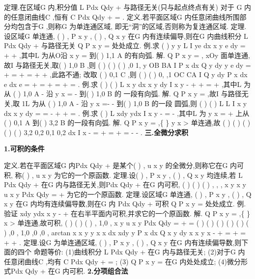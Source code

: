 \textcolor{lyred}{定理}.在区域G 内,积分值
L
Pdx
Qdy
+
\int 
与路径无关(只与起点终点有关) \Leftrightarrow 对于 
G 内的任意闭曲线C ,恒有
C
Pdx
Qdy
+
=
\int \nabla 
. 
\textcolor{lyred}{定义}.若平面区域G 内任意闭曲线所围部分均包含于G ,则称G 为\textcolor{lyred}{单连通区域},\textcolor{lyred}{ }
即无“洞”的区域,否则称为\textcolor{lyred}{复连通区域}. 
\textcolor{lyred}{定理}.设区域G 单连通,
(
)
,
P x y ,
(
)
,
Q x y 在G 内有连续偏导,则在G 内曲线积分 
L
Pdx
Qdy
+
\int 
与路径无关
Q
P
x
y
\partial 
\partial 
\Leftrightarrow 
=
\partial 
\partial 处处成立. 
\textcolor{lyred}{例}.求
(
)
y
y
L
I
ye dx
x
y
e dy
=
+
+
\int 
,其中L 为从O沿
x
y
=
到(
)
1,1
A
的有向弧. 
解. Q
P
x
y
\partial 
\partial 
=
\partial 
\partial , xOy 面单连通,故I 与路径无关,取(
)
1,0
B
,则 
(
)
(
)
(
)
,0
1,
y
OB
BA
I
P x
dx
Q
y dy
y
e dy
=
+
=
+
=
+
+
\int 
\int 
\int 
\int 
\int 
,此路不通; 
改取
(
)
0,1
C
,则
(
)
(
)
0,
,1
OC
CA
I
Q
y dy
P x
dx
e dx
e
=
+
=
+
=
+
\cdots 
=
\int 
\int 
\int 
\int 
\int 
. 
\textcolor{lyred}{例}.求
(
)
(
)
L
x
y dx
x
y dy
I
x
y
-
+
+
=
+
\int 
,其中L 为从
(
)
1,0
A -
沿
y
x
=
-
到(
)
1,0
B
的 
一段有向弧. 
解. Q
P
x
y
\partial 
\partial 
=
\partial 
\partial ,故I 与路径无关,取
1L 为从
(
)
1,0
A -
沿
y
x
=-
-
到(
)
1,0
B
的一段 
圆弧,则
(
)
(
)
L
L
I
x
y dx
x
y dy
\pi 
=
=
-
+
+
=
\int 
\int 
. 
\textcolor{lyred}{例}.求
(
)
L
xdy
ydx
I
x
y
-
=
-
\int 
,其中L 为
y
x
=
+
上从(
)
0,1
A
到(
)
3,2
B
的一段有向弧. 
解. Q
P
x
y
\partial 
\partial 
=
\partial 
\partial ,\{
\}
y
x
>
单连通,故
(
)
(
)
(
)
(
)
(
)
3,2
0,2
0,1
0,2
dx
I
x
-
=
+
=
+
=
-
-
\int 
\int 
\int 
. 
\vspace{4pt}
{\bfseries \textcolor{lyred}{三.全微分求积}}

{\bfseries \textcolor{lyred}{1.可积的条件}}

\textcolor{lyred}{定义}.若在平面区域G 内Pdx
Qdy
+
是某个(
)
,
u x y 的全微分,则称它在G 内\textcolor{lyred}{可积}, 
称(
)
,
u x y 为它的一个\textcolor{lyred}{原函数}. 
\textcolor{lyred}{定理}.设(
)
,
P x y ,
(
)
,
Q x y 均连续,若
L
Pdx
Qdy
+
\int 
在G 内与路径无关,则Pdx
Qdy
+
在G 内可积, (
)
(
)
(
)
,
,
,
x y
x
y
u x y
Pdx
Qdy
=
+
\int 
为它的一个原函数. 
\textcolor{lyred}{定理}.设区域G 单连通, (
)
,
P x y ,
(
)
,
Q x y 在G 内均有连续偏导数,则在G 内 
Pdx
Qdy
+
可积
Q
P
x
y
\partial 
\partial 
\Leftrightarrow 
=
\partial 
\partial 处处成立. 
\textcolor{lyred}{例}.验证
xdy
ydx
x
y
-
+
在右半平面内可积,并求它的一个原函数. 
解. Q
P
x
y
\partial 
\partial 
=
\partial 
\partial ,\{
\}
x >
单连通,故可积, (
)
(
)
(
)
,
1,0
,
x y
u x y
Pdx
Qdy
=
+
=
\int 
(
)
(
)
(
)
(
)
(
)
(
)
,0
,
1,0
,0
,0
,
arctan
x
x y
y
x
x
dx
xdy
y
P x
dx
Q x y dy
x
x
y
x
-\cdots 
+
=
+
=
+
+
\int 
\int 
\int 
\int 
. 
\textcolor{lyred}{定理}.设G 为单连通区域,
(
)
,
P x y ,
(
)
,
Q x y 在G 内有连续偏导数,则下面的四个 
命题等价: 
(1)曲线积分
L
Pdx
Qdy
+
\int 
在G 内与路径无关; 
(2)对于G 内任意闭曲线C ,均有
C
Pdx
Qdy
+
=
\int \nabla 
; 
(3) Q
P
x
y
\partial 
\partial 
=
\partial 
\partial 在G 内处处成立; 
(4)微分形式Pdx
Qdy
+
在G 内可积. 
{\bfseries \textcolor{lyred}{2.分项组合法}}

